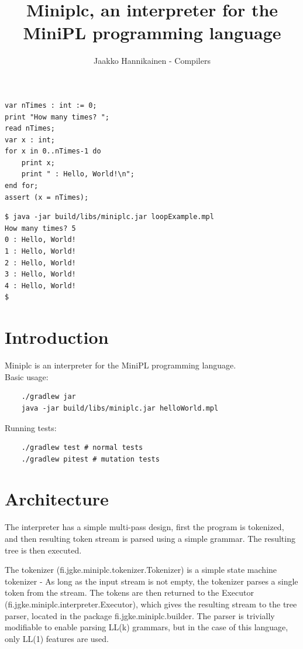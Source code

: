 \documentclass{article}
\author{Jaakko Hannikainen - Compilers}
\title{Miniplc, an interpreter for the MiniPL programming language}
\begin{document}
\maketitle

\noindent
\begin{minipage}{0.49\textwidth}
\begin{verbatim}
var nTimes : int := 0;
print "How many times? ";
read nTimes;
var x : int;
for x in 0..nTimes-1 do
    print x;
    print " : Hello, World!\n";
end for;
assert (x = nTimes);
\end{verbatim}
\end{minipage}
\begin{minipage}{0.49\textwidth}
\begin{verbatim}
$ java -jar build/libs/miniplc.jar loopExample.mpl
How many times? 5
0 : Hello, World!
1 : Hello, World!
2 : Hello, World!
3 : Hello, World!
4 : Hello, World!
$
\end{verbatim}
\end{minipage}

\vfill

\section{Introduction}
Miniplc is an interpreter for the MiniPL programming language. \\[1.5em]

\noindent
Basic usage:
\begin{verbatim}
    ./gradlew jar
    java -jar build/libs/miniplc.jar helloWorld.mpl
\end{verbatim}

\noindent
Running tests:
\begin{verbatim}
    ./gradlew test # normal tests
    ./gradlew pitest # mutation tests
\end{verbatim}

\vfill

\newpage
\section{Architecture}
\label{sec:architecture}
The interpreter has a simple multi-pass design, first the program is tokenized,
and then resulting token stream is parsed using a simple grammar. The resulting
tree is then executed.

The tokenizer (fi.jgke.miniplc.tokenizer.Tokenizer) is a simple state machine
tokenizer - As long as the input stream is not empty, the tokenizer parses a
single token from the stream. The tokens are then returned to the Executor
(fi.jgke.miniplc.interpreter.Executor), which gives the resulting stream to the
tree parser, located in the package fi.jgke.miniplc.builder. The parser is
trivially modifiable to enable parsing LL(k) grammars, but in the case of this
language, only LL(1) features are used.
\end{document}
